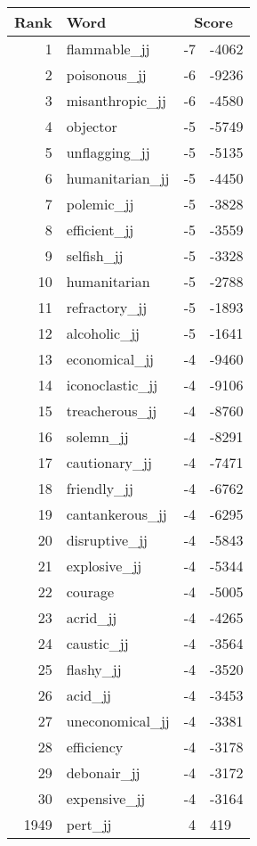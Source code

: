 \begin{longtable}[!htbp]{| rlr@{.}l |}
    \hline
    \textbf{Rank} & \textbf{Word} & \multicolumn{2}{c|}{\textbf{Score}} \\
    \hline
    \endhead
    1 & flammable\_jj & -7 & -4062 \\
    2 & poisonous\_jj & -6 & -9236 \\
    3 & misanthropic\_jj & -6 & -4580 \\
    4 & objector & -5 & -5749 \\
    5 & unflagging\_jj & -5 & -5135 \\
    6 & humanitarian\_jj & -5 & -4450 \\
    7 & polemic\_jj & -5 & -3828 \\
    8 & efficient\_jj & -5 & -3559 \\
    9 & selfish\_jj & -5 & -3328 \\
    10 & humanitarian & -5 & -2788 \\
    11 & refractory\_jj & -5 & -1893 \\
    12 & alcoholic\_jj & -5 & -1641 \\
    13 & economical\_jj & -4 & -9460 \\
    14 & iconoclastic\_jj & -4 & -9106 \\
    15 & treacherous\_jj & -4 & -8760 \\
    16 & solemn\_jj & -4 & -8291 \\
    17 & cautionary\_jj & -4 & -7471 \\
    18 & friendly\_jj & -4 & -6762 \\
    19 & cantankerous\_jj & -4 & -6295 \\
    20 & disruptive\_jj & -4 & -5843 \\
    21 & explosive\_jj & -4 & -5344 \\
    22 & courage & -4 & -5005 \\
    23 & acrid\_jj & -4 & -4265 \\
    24 & caustic\_jj & -4 & -3564 \\
    25 & flashy\_jj & -4 & -3520 \\
    26 & acid\_jj & -4 & -3453 \\
    27 & uneconomical\_jj & -4 & -3381 \\
    28 & efficiency & -4 & -3178 \\
    29 & debonair\_jj & -4 & -3172 \\
    30 & expensive\_jj & -4 & -3164 \\
    1949 & pert\_jj & 4 & 419 \\

\end{longtable}

